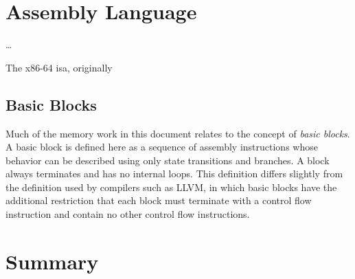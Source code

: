 %
%

\section{Assembly Language}
\todo\dots

The x86-64
\ac{isa}, originally 

\subsection{Basic Blocks}
Much of the memory work in this document relates to the concept of \emph{basic blocks}.%
A basic block is defined here as a sequence of assembly instructions
whose behavior can be described using only state transitions and branches.
A block always terminates and has no internal loops.
This definition differs slightly from the definition used by compilers such as LLVM,
in which basic blocks have the additional restriction that
each block must terminate with a control flow instruction and contain no other
control flow instructions.

\section{Summary}
